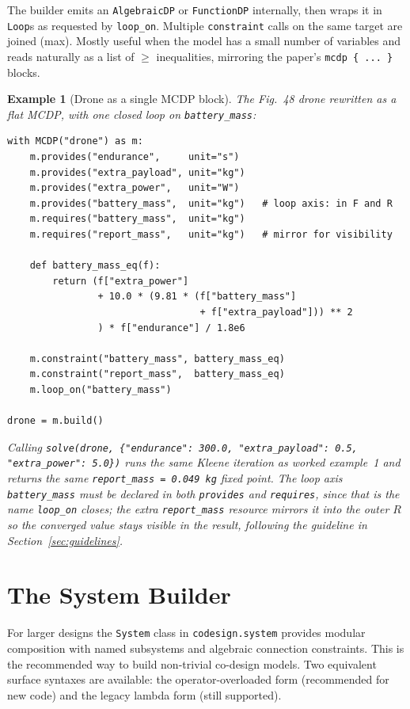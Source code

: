 \documentclass[11pt,a4paper]{article}
\newtheorem{example}[definition]{Example}
\begin{document}
The builder emits an \texttt{AlgebraicDP} or \texttt{FunctionDP}
internally, then wraps it in \texttt{Loop}s as requested by
\texttt{loop\_on}. Multiple \texttt{constraint} calls on the same
target are joined (max). Mostly useful when the model has a small
number of variables and reads naturally as a list of $\geq$
inequalities, mirroring the paper's \texttt{mcdp \{ ... \}} blocks.

\begin{example}[Drone as a single MCDP block]
The Fig.~48 drone rewritten as a flat MCDP, with one closed loop on
\texttt{battery\_mass}:
\begin{lstlisting}
with MCDP("drone") as m:
    m.provides("endurance",     unit="s")
    m.provides("extra_payload", unit="kg")
    m.provides("extra_power",   unit="W")
    m.provides("battery_mass",  unit="kg")   # loop axis: in F and R
    m.requires("battery_mass",  unit="kg")
    m.requires("report_mass",   unit="kg")   # mirror for visibility

    def battery_mass_eq(f):
        return (f["extra_power"]
                + 10.0 * (9.81 * (f["battery_mass"]
                                  + f["extra_payload"])) ** 2
                ) * f["endurance"] / 1.8e6

    m.constraint("battery_mass", battery_mass_eq)
    m.constraint("report_mass",  battery_mass_eq)
    m.loop_on("battery_mass")

drone = m.build()
\end{lstlisting}
Calling \texttt{solve(drone, \{"endurance": 300.0, "extra\_payload":
0.5, "extra\_power": 5.0\})} runs the same Kleene iteration as worked
example~1 and returns the same \texttt{report\_mass = 0.049 kg} fixed
point. The loop axis \texttt{battery\_mass} must be declared in both
\texttt{provides} and \texttt{requires}, since that is the name
\texttt{loop\_on} closes; the extra \texttt{report\_mass} resource
mirrors it into the outer $R$ so the converged value stays visible in
the result, following the guideline in Section~\ref{sec:guidelines}.
\end{example}

\section{The System Builder}
\label{sec:system-builder}

For larger designs the \texttt{System} class in \texttt{codesign.system}
provides modular composition with named subsystems and algebraic
connection constraints. This is the recommended way to build
non-trivial co-design models. Two equivalent surface syntaxes are
available: the operator-overloaded form (recommended for new code) and
the legacy lambda form (still supported).
\end{document}
